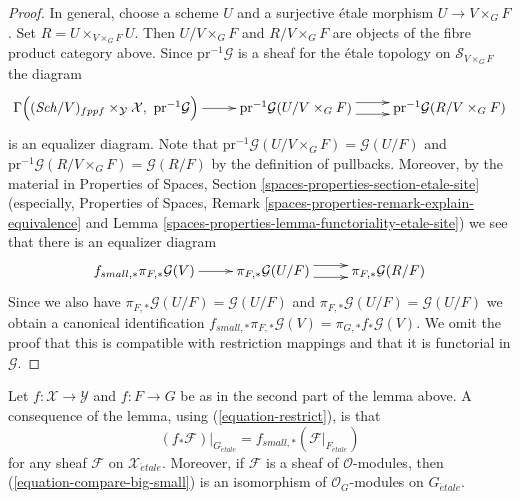 \documentclass{stacks-project}
\theoremstyle{plain}
\theoremstyle{definition}
\theoremstyle{remark}
\numberwithin{equation}{subsection}
\def\Sch{\mathit{Sch}}
\def\etale{{\acute{e}tale}}
\begin{document}
\begin{proof}
\medskip\noindent
In general, choose a scheme $U$ and a surjective \'etale morphism
$U \to V \times_G F$. Set $R = U \times_{V \times_G F} U$. Then
$U/V \times_G F$ and $R/V \times_G F$ are objects of the fibre
product category above. Since $\text{pr}^{-1}\mathcal{G}$ is a
sheaf for the \'etale topology on $\mathcal{S}_{V \times_G F}$
the diagram
$$
\xymatrix{
\Gamma\Big(
(\Sch/V)_{fppf} \times_{\mathcal{Y}} \mathcal{X},
\ \text{pr}^{-1}\mathcal{G}\Big)
\ar[r] &
\text{pr}^{-1}\mathcal{G}(U/V \times_G F) \ar@<1ex>[r] \ar@<-1ex>[r] &
\text{pr}^{-1}\mathcal{G}(R/V \times_G F)
}
$$
is an equalizer diagram. Note that
$\text{pr}^{-1}\mathcal{G}(U/V \times_G F) = \mathcal{G}(U/F)$
and $\text{pr}^{-1}\mathcal{G}(R/V \times_G F) = \mathcal{G}(R/F)$
by the definition of pullbacks. Moreover, by the material in
Properties of Spaces, Section \ref{spaces-properties-section-etale-site}
(especially,
Properties of Spaces,
Remark \ref{spaces-properties-remark-explain-equivalence} and
Lemma \ref{spaces-properties-lemma-functoriality-etale-site})
we see that there is an equalizer diagram
$$
\xymatrix{
f_{small, *}\pi_{F, *}\mathcal{G}(V)
\ar[r] &
\pi_{F, *}\mathcal{G}(U/F) \ar@<1ex>[r] \ar@<-1ex>[r] &
\pi_{F, *}\mathcal{G}(R/F)
}
$$
Since we also have $\pi_{F, *}\mathcal{G}(U/F) = \mathcal{G}(U/F)$
and $\pi_{F, *}\mathcal{G}(U/F) = \mathcal{G}(U/F)$
we obtain a canonical identification
$f_{small, *}\pi_{F, *}\mathcal{G}(V) = \pi_{G, *}f_*\mathcal{G}(V)$.
We omit the proof that this is compatible with restriction mappings
and that it is functorial in $\mathcal{G}$.
\end{proof}

\noindent
Let $f : \mathcal{X} \to \mathcal{Y}$ and $f : F \to G$ be as in the
second part of the lemma above. A consequence of the lemma, using
(\ref{equation-restrict}), is that
\begin{equation}
\label{equation-compare-big-small}
(f_*\mathcal{F})|_{G_\etale} =
f_{small, *}(\mathcal{F}|_{F_\etale})
\end{equation}
for any sheaf $\mathcal{F}$ on $\mathcal{X}_\etale$.
Moreover, if $\mathcal{F}$ is a sheaf of $\mathcal{O}$-modules, then
(\ref{equation-compare-big-small}) is an isomorphism of
$\mathcal{O}_G$-modules on $G_\etale$.
\end{document}
